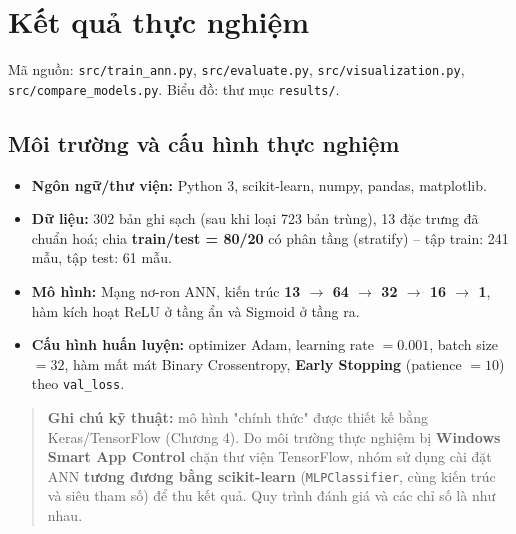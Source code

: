 
\chapter{Kết quả thực nghiệm}
\label{chap:results}

Mã nguồn: \texttt{src/train\_ann.py}, \texttt{src/evaluate.py},
\texttt{src/visualization.py}, \texttt{src/compare\_models.py}.
Biểu đồ: thư mục \texttt{results/}.

\section{Môi trường và cấu hình thực nghiệm}
\begin{itemize}
  \item \textbf{Ngôn ngữ/thư viện:} Python 3, scikit-learn, numpy, pandas,
        matplotlib.
  \item \textbf{Dữ liệu:} 302 bản ghi sạch (sau khi loại 723 bản trùng), 13 đặc
        trưng đã chuẩn hoá; chia \textbf{train/test = 80/20} có phân tầng
        (stratify) -- tập train: 241 mẫu, tập test: 61 mẫu.
  \item \textbf{Mô hình:} Mạng nơ-ron ANN, kiến trúc
        \textbf{13 $\to$ 64 $\to$ 32 $\to$ 16 $\to$ 1}, hàm kích hoạt ReLU ở
        tầng ẩn và Sigmoid ở tầng ra.
  \item \textbf{Cấu hình huấn luyện:} optimizer Adam, learning rate $= 0.001$,
        batch size $= 32$, hàm mất mát Binary Crossentropy, \textbf{Early
        Stopping} (patience $= 10$) theo \texttt{val\_loss}.
\end{itemize}

\begin{quote}
\textbf{Ghi chú kỹ thuật:} mô hình "chính thức" được thiết kế bằng
Keras/TensorFlow (Chương 4). Do môi trường thực nghiệm bị \textbf{Windows Smart
App Control} chặn thư viện TensorFlow, nhóm sử dụng cài đặt ANN \textbf{tương
đương bằng scikit-learn} (\texttt{MLPClassifier}, cùng kiến trúc và siêu tham
số) để thu kết quả. Quy trình đánh giá và các chỉ số là như nhau.
\end{quote}

